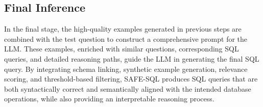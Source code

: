 \subsection{Final Inference}
In the final stage, the high-quality examples generated in previous steps are combined with the test question to construct a comprehensive prompt for the LLM. These examples, enriched with similar questions, corresponding SQL queries, and detailed reasoning paths, guide the LLM in generating the final SQL query. By integrating schema linking, synthetic example generation, relevance scoring, and threshold-based filtering, SAFE-SQL produces SQL queries that are both syntactically correct and semantically aligned with the intended database operations, while also providing an interpretable reasoning process.


